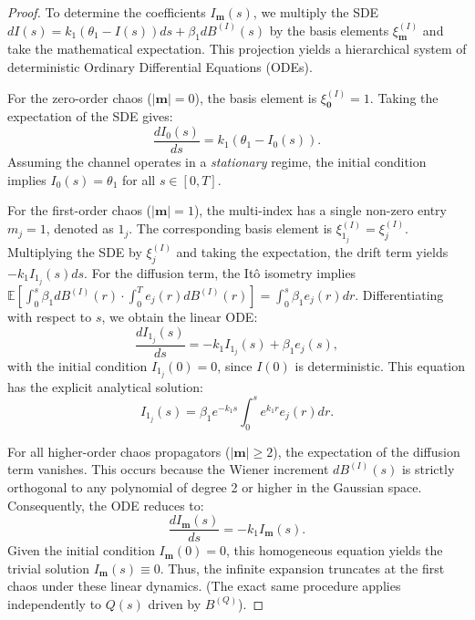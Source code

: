 \documentclass[11pt]{article}
\begin{document}
\begin{proof}
To determine the coefficients $I_{\mathbf{m}}(s)$, we multiply the SDE $dI(s) = k_1(\theta_1 - I(s))ds + \beta_1 dB^{(I)}(s)$ by the basis elements $\xi_{\mathbf{m}}^{(I)} $ and take the mathematical expectation. This projection yields a hierarchical system of deterministic Ordinary Differential Equations (ODEs).

For the zero-order chaos ($|\mathbf{m}| = 0$), the basis element is $\xi_{\mathbf{0}}^{(I)} = 1$. Taking the expectation of the SDE gives:
\begin{equation}
    \frac{d I_0(s)}{ds} = k_1(\theta_1 - I_0(s)).
\end{equation}
Assuming the channel operates in a \textit{stationary} regime, the initial condition implies $I_0(s) = \theta_1$ for all $s \in [0,T]$.

For the first-order chaos ($|\mathbf{m}| = 1$), the multi-index has a single non-zero entry $m_j = 1$, denoted as $1_j$. The corresponding basis element is $\xi_{1_j}^{(I)} = \xi_j^{(I)}$. Multiplying the SDE by $\xi_j^{(I)}$ and taking the expectation, the drift term yields $-k_1 I_{1_j}(s) ds$. For the diffusion term, the Itô isometry implies $\mathbb{E}\left[\int_0^s \beta_1 dB^{(I)}(r) \cdot \int_0^T e_j(r) dB^{(I)}(r)\right] = \int_0^s \beta_1 e_j(r) dr$. Differentiating with respect to $s$, we obtain the linear ODE:
\begin{equation}
    \frac{d I_{1_j}(s)}{ds} = -k_1 I_{1_j}(s) + \beta_1 e_j(s),
\end{equation}
with the initial condition $I_{1_j}(0) = 0$, since $I(0)$ is deterministic. This equation has the explicit analytical solution:
\begin{equation} \label{eq:first_chaos_I}
    I_{1_j}(s) = \beta_1 e^{-k_1 s} \int_0^s e^{k_1 r} e_j(r) dr.
\end{equation}

For all higher-order chaos propagators ($|\mathbf{m}| \geq 2$), the expectation of the diffusion term vanishes. This occurs because the Wiener increment $dB^{(I)}(s)$ is strictly orthogonal to any polynomial of degree 2 or higher in the Gaussian space. Consequently, the ODE reduces to:
\begin{equation}
    \frac{d I_{\mathbf{m}}(s)}{ds} = -k_1 I_{\mathbf{m}}(s).
\end{equation}
Given the initial condition $I_{\mathbf{m}}(0) = 0$, this homogeneous equation yields the trivial solution $I_{\mathbf{m}}(s) \equiv 0$. Thus, the infinite expansion truncates at the first chaos under these linear dynamics. (The exact same procedure applies independently to $Q(s)$ driven by $B^{(Q)}$).
\end{proof}
\end{document}
